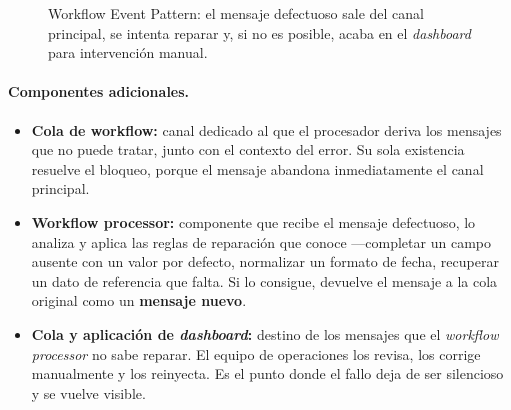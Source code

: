 \begin{figure}[h]
\centering
{}
\caption{Workflow Event Pattern: el mensaje defectuoso sale del canal principal, se intenta reparar y, si no es posible, acaba en el \emph{dashboard} para intervención manual.}
\end{figure}

\paragraph{Componentes adicionales.}
\begin{itemize}[leftmargin=1.5em]
  \item \textbf{Cola de workflow:} canal dedicado al que el procesador deriva los mensajes que no puede tratar, junto con el contexto del error. Su sola existencia resuelve el bloqueo, porque el mensaje abandona inmediatamente el canal principal.
  \item \textbf{Workflow processor:} componente que recibe el mensaje defectuoso, lo analiza y aplica las reglas de reparación que conoce ---completar un campo ausente con un valor por defecto, normalizar un formato de fecha, recuperar un dato de referencia que falta. Si lo consigue, devuelve el mensaje a la cola original como un \textbf{mensaje nuevo}.
  \item \textbf{Cola y aplicación de \emph{dashboard}:} destino de los mensajes que el \emph{workflow processor} no sabe reparar. El equipo de operaciones los revisa, los corrige manualmente y los reinyecta. Es el punto donde el fallo deja de ser silencioso y se vuelve visible.
\end{itemize}

